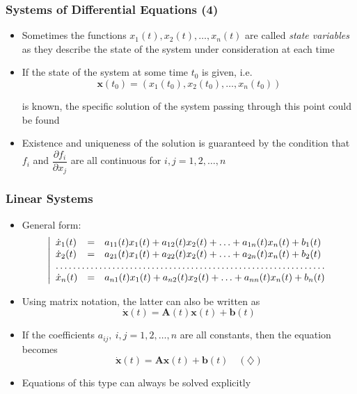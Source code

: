 \documentclass[10pt,usenames,dvipsnames]{beamer}
\theoremstyle{definition}
\begin{document}
\begin{frame}[fragile]
	\frametitle{Systems of Differential Equations (4)}
	\begin{itemize}
		\item Sometimes the functions $ x_{1}(t), x_{2}(t), \ldots, x_{n}(t) $ are called \textit{state variables} as they describe the state of the system under consideration at each time
		
		\item If the state of the system at some time $ t_{0} $ is given, i.e. 
		\[
			\mathbf{x}(t_{0}) = (x_{1}(t_{0}), x_{2}(t_{0}), \ldots, x_{n}(t_{0}))
		\]
		
		is known, the specific solution of the system passing through this point could be found
		
		\item Existence and uniqueness of the solution is guaranteed by the condition that $ f_{i} $ and $ \dfrac{\partial f_{i}}{\partial x_{j}} $ are all continuous for $ i,j = 1,2,\ldots,n $
	\end{itemize}
\end{frame}

\begin{frame}[fragile]
	\frametitle{Linear Systems}
	\begin{itemize}
		\item General form:
		\[
			\left|
			\begin{array}{lcl}
				\dot{x}_{1}(t) & = & a_{11}(t)x_{1}(t) + a_{12}(t)x_{2}(t) + \ldots + a_{1n}(t)x_{n}(t) + b_{1}(t)\\
				\dot{x}_{2}(t) & = & a_{21}(t)x_{1}(t) + a_{22}(t)x_{2}(t) + \ldots + a_{2n}(t)x_{n}(t)+ b_{2}(t)\\
				\hdotsfor{3}\\
				\dot{x}_{n}(t) & = & a_{n1}(t)x_{1}(t) + a_{n2}(t)x_{2}(t) + \ldots + a_{nn}(t)x_{n}(t) + b_{n}(t)
			\end{array}\right.
		\]
		
		\item Using matrix notation, the latter can also be written as
		\[
			\dot{\mathbf{x}}(t) = \mathbf{A}(t)\mathbf{x}(t) + \mathbf{b}(t)
		\]
		
		\item If the coefficients $ a_{ij}, \ i,j = 1,2,\ldots,n $ are all constants, then the equation becomes
		\[
			\dot{\mathbf{x}}(t) = \mathbf{A}\mathbf{x}(t) + \mathbf{b}(t) \quad (\diamondsuit)
		\]
		
		\item Equations of this type can always be solved explicitly
	\end{itemize}
\end{frame}
\end{document}
